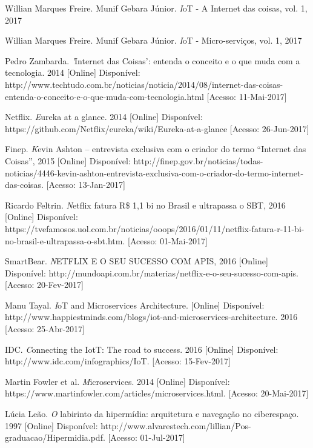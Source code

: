 \documentclass[journal]{IEEEtran}
\begin{document}
\begin{thebibliography}{1}

Willian Marques Freire. Munif Gebara Júnior. \emph IoT - A Internet das coisas, vol. 1, 2017

Willian Marques Freire. Munif Gebara Júnior. \emph IoT - Micro-serviços, vol. 1, 2017

Pedro Zambarda. \emph 'Internet das Coisas': entenda o conceito e o que muda com a tecnologia. 2014 [Online] Disponível: http://www.techtudo.com.br/noticias/noticia/2014/08/internet-das-coisas-entenda-o-conceito-e-o-que-muda-com-tecnologia.html [Acesso: 11-Mai-2017]

Netflix. \emph Eureka at a glance. 2014 [Online] Disponível: 
https://github.com/Netflix/eureka/wiki/Eureka-at-a-glance
[Acesso: 26-Jun-2017]

Finep. \emph Kevin Ashton – entrevista exclusiva com o criador do termo “Internet das Coisas”, 2015 [Online] Disponível: http://finep.gov.br/noticias/todas-noticias/4446-kevin-ashton-entrevista-exclusiva-com-o-criador-do-termo-internet-das-coisas. [Acesso: 13-Jan-2017]

Ricardo Feltrin. \emph Netflix fatura R\$ 1,1 bi no Brasil e ultrapassa o SBT, 2016 [Online] Disponível: https://tvefamosos.uol.com.br/noticias/ooops/2016/01/11/netflix-fatura-r-11-bi-no-brasil-e-ultrapassa-o-sbt.htm. [Acesso: 01-Mai-2017]

SmartBear. \emph NETFLIX E O SEU SUCESSO COM APIS, 2016 [Online] Disponível: http://mundoapi.com.br/materias/netflix-e-o-seu-sucesso-com-apis. [Acesso: 20-Fev-2017] 

Manu Tayal. \emph IoT and Microservices Architecture. [Online] Disponível: http://www.happiestminds.com/blogs/iot-and-microservices-architecture. 2016 [Acesso: 25-Abr-2017]

IDC. \emph Connecting the IotT: The road to success. 2016 [Online] Disponível: http://www.idc.com/infographics/IoT. [Acesso: 15-Fev-2017]

Martin Fowler et al. \emph Microservices. 2014 [Online] Disponível: https://www.martinfowler.com/articles/microservices.html. [Acesso: 20-Mai-2017]

Lúcia Leão. \emph O labirinto da hipermídia: arquitetura e navegação no ciberespaço. 1997 [Online]
Disponível:
http://www.alvarestech.com/lillian/Pos-graduacao/Hipermidia.pdf. [Acesso: 01-Jul-2017]



\end{thebibliography}
\end{document}
